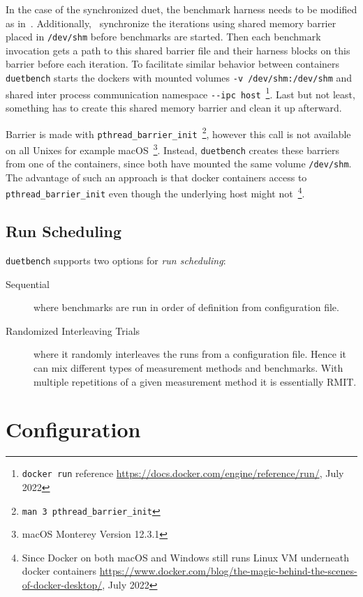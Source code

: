 In the case of the synchronized duet, the benchmark harness needs to be modified as in~\citet{bulej2020duet}.
Additionally,~\citet{bulej2020duet} synchronize the iterations using shared memory barrier placed in \lstinline{/dev/shm} before benchmarks are started.
Then each benchmark invocation gets a path to this shared barrier file and their harness blocks on this barrier before each iteration.
To facilitate similar behavior between containers \lstinline{duetbench} starts the dockers with mounted volumes \lstinline{-v /dev/shm:/dev/shm} and shared inter process communication namespace \lstinline{--ipc host}~\footnote{\lstinline{docker run} reference \url{https://docs.docker.com/engine/reference/run/}, July 2022}.
Last but not least, something has to create this shared memory barrier and clean it up afterward.

Barrier is made with \lstinline{pthread_barrier_init}~\footnote{\lstinline{man 3 pthread_barrier_init}}, however this call is not available on all Unixes for example macOS~\footnote{macOS Monterey Version 12.3.1}.
Instead, \lstinline{duetbench} creates these barriers from one of the containers, since both have mounted the same volume \lstinline{/dev/shm}.
The advantage of such an approach is that docker containers access to \lstinline{pthread_barrier_init} even though the underlying host might not~\footnote{Since Docker on both macOS and Windows still runs Linux VM underneath docker containers \url{https://www.docker.com/blog/the-magic-behind-the-scenes-of-docker-desktop/}, July 2022}.

\subsection{Run Scheduling}
\label{sec:scheduling}

\lstinline{duetbench} supports two options for \emph{run scheduling}:
\begin{description}
    \item[Sequential] where benchmarks are run in order of definition from configuration file.
    \item[Randomized Interleaving Trials] where it randomly interleaves the runs from a configuration file.
        Hence it can mix different types of measurement methods and benchmarks.
        With multiple repetitions of a given measurement method it is essentially RMIT\cite{abedi2017conducting}.
\end{description}

\section{Configuration}
\label{sec:configuration}

